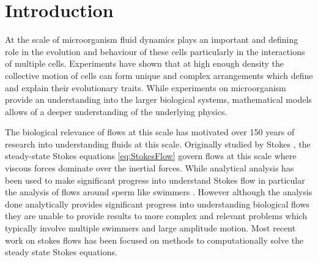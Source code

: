 \section{Introduction}
At the scale of microorganism fluid dynamics plays an important and defining role in the evolution and behaviour of these cells particularly in the interactions of multiple cells. Experiments have shown that at high enough density the collective motion of cells can form unique and complex arrangements which define and explain their evolutionary traits. While experiments on microorganism provide an understanding into the larger biological systems, mathematical models allows of a deeper understanding of the underlying physics. 

The biological relevance of flows at this scale has motivated over 150 years of research into understanding fluids at this scale. Originally studied by Stokes \cite{Stokes2010OnPendulums}, the steady-state Stokes equations \cref{eq:StokesFlow} govern flows at this scale where viscous forces dominate over the inertial forces. While analytical analysis has been used to make significant progress into understand Stokes flow in particular the analysis of flows around sperm like swimmers \cite{Hancock1953TheLiquids,GRAY1955TheSpermatozoa,Taylor1951AnalysisOrganisms}. However although the analysis done analytically provides significant progress into understanding biological flows they are unable to provide results to more complex and relevant problems which typically involve multiple swimmers and large amplitude motion. Most recent work on stokes flows has been focused on methods to computationally solve the steady state Stokes equations. 

